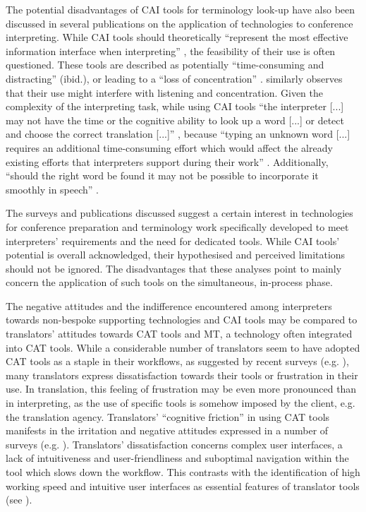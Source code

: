 The potential disadvantages of CAI tools for terminology look-up have also been discussed in several publications on the application of technologies to conference interpreting. While CAI tools should theoretically ``represent the most effective information interface when interpreting'' \citep[90]{tripepi_winteringham_usefulness_2010}, the feasibility of their use is often questioned. These tools are described as potentially ``time-consuming and distracting'' (ibid.), or leading to a ``loss of concentration'' \citep[91]{tripepi_winteringham_usefulness_2010}. \citet{berber-irabien_information_2010} similarly observes that their use might interfere with listening and concentration. Given the complexity of the interpreting task, while using CAI tools ``the interpreter [...] may not have the time or the cognitive ability to look up a word [...] or detect and choose the correct translation [...]'' \citep[49]{fantinuoli_interpretbank._2016}, because ``typing an unknown word [...] requires an additional time-consuming effort which would affect the already existing efforts that interpreters support during their work'' \citep[91]{tripepi_winteringham_usefulness_2010}. Additionally, ``should the right word be found it may not be possible to incorporate it smoothly in speech'' \citep[80]{veisbergs_terminology_2007}.

The surveys and publications discussed suggest a certain interest in technologies for conference preparation and terminology work specifically developed to meet interpreters' requirements and the need for dedicated tools. While CAI tools' potential is overall acknowledged, their hypothesised and perceived limitations should not be ignored. The disadvantages that these analyses point to mainly concern the application of such tools on the simultaneous, in-process phase.

The negative attitudes and the indifference encountered among interpreters towards non-bespoke supporting technologies and CAI tools may be compared to translators’ attitudes towards CAT tools and MT, a technology often integrated into CAT tools. While a considerable number of translators seem to have adopted CAT tools as a staple in their workflows, as suggested by recent surveys (e.g. \citealt{moorkens_assessing_2016,steurs2017translators}), many translators express dissatisfaction towards their tools or frustration in their use. In translation, this feeling of frustration may be even more pronounced than in interpreting, as the use of specific tools is somehow imposed by the client, e.g. the translation agency. Translators' ``cognitive friction'' \citep{ehrensberger2015ergonomics} in using CAT tools manifests in the irritation and negative attitudes expressed in a number of surveys (e.g. \citealt{OBrien_Ehrensberger-Dow_Connolly_Hasler_2017}). Translators' dissatisfaction concerns complex user interfaces, a lack of intuitiveness and user-friendliness and suboptimal navigation within the tool which slows down the workflow. This contrasts with the identification of high working speed and intuitive user interfaces as essential features of translator tools (see \citealt{OBrien_Ehrensberger-Dow_Connolly_Hasler_2017}).

